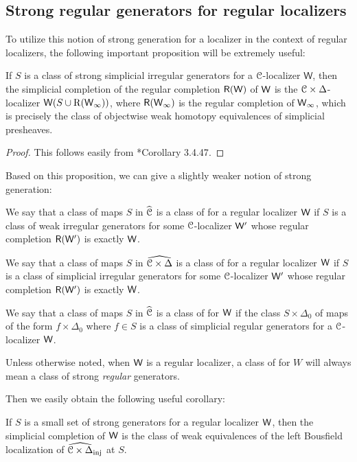 \subsection{Strong regular generators for regular localizers}
To utilize this notion of strong generation for a localizer in the context of regular localizers, the following important proposition will be extremely useful:
\begin{prop}If \(S\) is a class of strong simplicial irregular generators for a \(\mathcal{C}\)-localizer \(\mathsf{W}\), then the simplicial completion of the regular completion \(\mathsf{R}(\mathsf{W})\) of \(\mathsf{W}\) is the \(\mathcal{C}\times \Delta\)-localizer \(\mathsf{W}(S \cup \operatorname{R}(\mathsf{W}_\infty))\), where \(\mathsf{R}(\mathsf{W}_\infty)\) is the regular completion of \(\mathsf{W}_\infty\), which is precisely the class of objectwise weak homotopy equivalences of simplicial presheaves.
\end{prop}
\begin{proof}This follows easily from \cite{cisinski-book}*{Corollary 3.4.47}.
\end{proof}
Based on this proposition, we can give a slightly weaker notion of strong generation:
\begin{defn} 
We say that a class of maps \(S\) in \(\widehat{\mathcal{C}}\) is a class of  for a regular localizer \(\mathsf{W}\) if \(S\) is a class of weak irregular generators for some \(\mathcal{C}\)-localizer \(\mathsf{W}^\prime\) whose regular completion \(\mathsf{R}(\mathsf{W}^\prime)\) is exactly \(\mathsf{W}\). 

We say that a class of maps \(S\) in \(\widehat{\mathcal{C}\times \Delta}\) is a class of  for a regular localizer \(\mathsf{W}\) if \(S\) is a class of simplicial irregular generators for some \(\mathcal{C}\)-localizer \(\mathsf{W}^\prime\) whose regular completion \(\mathsf{R}(\mathsf{W}^\prime)\) is exactly \(\mathsf{W}\). 

We say that a class of maps \(S\)  in \(\widehat{\mathcal{C}}\) is a class of  for \(\mathsf{W}\)  if the class \(S\times \Delta_0\) of maps of the form \(f\times \Delta_0\) where \(f\in S\) is a class of simplicial regular generators for a \(\mathcal{C}\)-localizer \(\mathsf{W}\).

Unless otherwise noted, when \(\mathsf{W}\) is a regular localizer, a class of  for \(W\) will always mean a class of strong \emph{regular} generators.   
\end{defn}
Then we easily obtain the following useful corollary:
\begin{cor} If \(S\) is a small set of strong generators for a regular localizer \(\mathsf{W}\), then the simplicial completion of \(\mathsf{W}\) is the class of weak equivalences of the left Bousfield localization of \(\widehat{\mathcal{C}\times \Delta}_{\operatorname{inj}}\) at \(S\).   
\end{cor}
